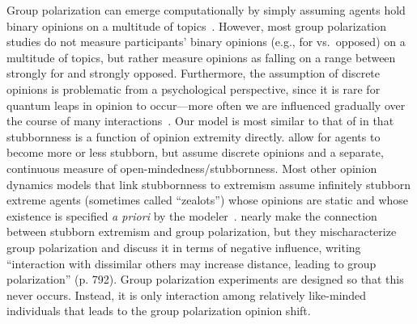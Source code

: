 Group polarization can emerge computationally by simply 
assuming agents hold binary opinions on a multitude of topics~\cite{Mueller2018,Banisch2019}. 
However, most group polarization studies do not measure participants' binary opinions (e.g., for vs.\ opposed) on a multitude of topics, but rather measure opinions as falling on a range between strongly for and strongly opposed. Furthermore, the assumption of discrete opinions is problematic from a psychological perspective,
since it is rare for quantum leaps in opinion to occur---more often we are
influenced gradually over the course of many interactions~\cite[p.793]{Baldassarri2007}.
Our model is most similar to that of  in that stubbornness is 
a function of opinion extremity directly.  allow for agents
to become more or less stubborn, but assume discrete opinions and a separate,
continuous measure of open-mindedness/stubbornness.
Most other opinion dynamics models that link 
stubbornness to extremism assume infinitely stubborn
extreme agents (sometimes called ``zealots'') whose opinions are static and whose existence is specified
\emph{a priori} by the modeler~\cite{Galam2007,Mobilia2007,Arendt2015,Mueller2018}.
 nearly make the connection between stubborn extremism
and group polarization, but they mischaracterize group polarization and discuss it in terms of negative influence, writing
``interaction with dissimilar others may increase distance, leading to group
polarization'' (p. 792). Group polarization experiments are designed so that
this never occurs. Instead, it is only interaction among relatively like-minded
individuals that leads to the group polarization opinion shift.


